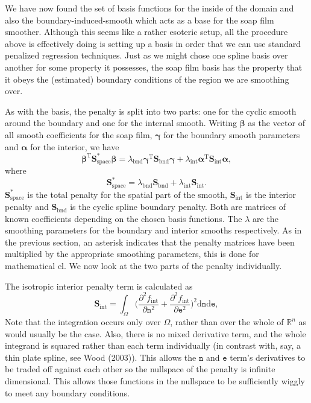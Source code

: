 \documentclass[10pt]{article}
\theoremstyle{definition}
\theoremstyle{plain}
\begin{document}
We have now found the set of basis functions for the inside of the domain and also the boundary-induced-smooth which acts as a base for the soap film smoother. Although this seems like a rather esoteric setup, all the procedure above is effectively doing is setting up a basis in order that we can use standard penalized regression techniques. Just as we might chose one spline basis over another for some property it possesses,  the soap film basis has the property that it obeys the (estimated) boundary conditions of the region we are smoothing over.

As with the basis, the penalty is split into two parts: one for the cyclic smooth around the boundary and one for the internal smooth. Writing $\bm\beta$ as the vector of all smooth coefficients for the soap film, $\bm\gamma$ for the boundary smooth parameters and $\bm\alpha$ for the interior, we have
$$
\bm\beta^\text{T}\textbf{S}^*_\text{space}\bm{\beta} = \lambda_\text{bnd} \bm\gamma^\text{T}\textbf{S}_\text{bnd}\bm{\gamma} + \lambda_\text{int} \bm{\alpha}^\text{T}\textbf{S}_\text{int}\bm{\alpha},
$$
where 
$$
\textbf{S}^*_\text{space} = \lambda_\text{bnd} \textbf{S}_\text{bnd} + \lambda_\text{int} \textbf{S}_\text{int}.
$$
$\textbf{S}^*_\text{space}$ is the total penalty for the spatial part of the smooth, $\textbf{S}_\text{int}$ is the interior penalty and $\textbf{S}_\text{bnd}$ is the cyclic spline boundary penalty. Both are matrices of known coefficients depending on the chosen basis functions. The $\lambda$ are the smoothing parameters for the boundary and interior smooths respectively. As in the previous section, an asterisk indicates that the penalty matrices have been multiplied by the appropriate smoothing parameters, this is done for mathematical el. We now look at the two parts of the penalty individually. 

The isotropic interior penalty term is calculated as
$$
\textbf{S}_\text{int} = \int_\Omega \Big(\frac{\partial^2 f_\text{int}}{\partial \texttt{n}^2}+\frac{\partial^2 f_\text{int}}{\partial \texttt{e}^2} 
\Big)^2\text{d}\texttt{n}\text{d}\texttt{e},
$$
Note that the integration occurs only over $\Omega$, rather than over the whole of $\mathbb{R}^n$ as would usually be the case. Also, there is no mixed derivative term, and the whole integrand is squared rather than each term individually (in contrast with, say, a thin plate spline, see Wood (2003)). This allows the $\texttt{n}$ and $\texttt{e}$ term's derivatives to be traded off against each other so the nullspace of the penalty is infinite dimensional. This allows those functions in the nullspace to be sufficiently wiggly to meet any boundary conditions. 
\end{document}
